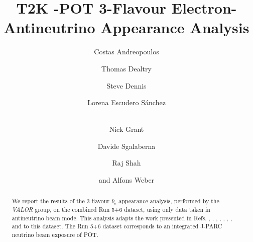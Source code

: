 %
%

\begin{frontmatter}

\title{
  T2K \TotalPot-POT 3-Flavour Electron-Antineutrino Appearance Analysis
}

\vspace*{0.7cm}

\author[RAL,LIV]  {Costas Andreopoulos}
\author[RAL,OXF]  {Thomas Dealtry}
\author[RAL,WAR]  {Steve Dennis}
\author[IFIC]     {Lorena Escudero S\'anchez}
\author[LANCS,WAR]{\\Nick Grant}
\author[ETHZ]     {Davide Sgalaberna}
\author[RAL,OXF]  {Raj Shah}
\author[RAL,OXF]  {and Alfons Weber}

\address[RAL]   {Science \& Technology Facilities Council (STFC), Rutherford Appleton Laboratory,\\ Harwell Oxford Campus, OX11 0QX, UK}
\address[LIV]   {University of Liverpool, Physics Department,\\ Liverpool, L69 7ZE, UK} 
\address[ETHZ]  {ETH Zurich, Institute for Particle Physics,\\ 8092 Zurich, Switzerland}
\address[OXF]   {University of Oxford, Subdepartment of Particle Physics,\\ Oxford, OX1 3RH, UK}
\address[WAR]   {University of Warwick, Physics Department,\\ Coventry, CV4 7AL, UK}
\address[IFIC]  {CSIC and University of Valencia, Instituto de Fisica Corpuscular, \\ E-46071 Valencia, Spain}
\address[LANCS] {Lancaster University, Physics Department,\\ Lancaster, LA1 4YB, UK}

%
%

\begin{abstract}

We report the results of the
3-flavour $\bar{\nu}_{e}$ appearance analysis, performed by the {\em VALOR} group,
on the combined Run 5+6 dataset, using only data taken in antineutrino beam mode.
This analysis adapts the work presented in Refs. 
\cite{OurRun1DisappAnalysis},
\cite{OurRun12DisappAnalysis}, 
\cite{OurRun12DisappAnalysis3Flavour},
\cite{OurRun123DisappAnalysis3Flavour},
\cite{OurRun1234aDisappAnalysis3Flavour},
\cite{OurRun1234DisappAnalysis3Flavour},
\cite{OurRun123JointOscillationAnalysis},
\cite{OurRun1234JointOscillationAnalysis} and
\cite{OurRun56AntiNumuDisappearanceAnalysis3Flavour}
to this dataset.
The Run 5+6 dataset corresponds to an integrated J-PARC neutrino beam
exposure of \TotalPot{} POT.


\end{abstract}
\end{frontmatter}
